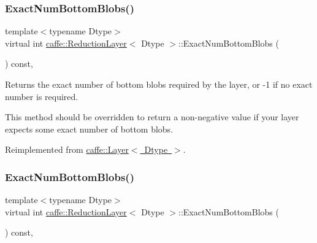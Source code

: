 \subsubsection{\texorpdfstring{Exact\+Num\+Bottom\+Blobs()}{ExactNumBottomBlobs()}\hspace{0.1cm}{\footnotesize\ttfamily [1/2]}}
{\footnotesize\ttfamily template$<$typename Dtype$>$ \\
virtual int \mbox{\hyperlink{classcaffe_1_1_reduction_layer}{caffe\+::\+Reduction\+Layer}}$<$ Dtype $>$\+::Exact\+Num\+Bottom\+Blobs (\begin{DoxyParamCaption}{ }\end{DoxyParamCaption}) const\hspace{0.3cm}{\ttfamily [inline]}, {\ttfamily [virtual]}}



Returns the exact number of bottom blobs required by the layer, or -\/1 if no exact number is required. 

This method should be overridden to return a non-\/negative value if your layer expects some exact number of bottom blobs. 

Reimplemented from \mbox{\hyperlink{classcaffe_1_1_layer_a8e5ee0494d85f5f55fc4396537cbc60f}{caffe\+::\+Layer$<$ Dtype $>$}}.

\mbox{\label{classcaffe_1_1_reduction_layer_a64694af2e56723590072cac88bf825c7}} 
\subsubsection{\texorpdfstring{Exact\+Num\+Bottom\+Blobs()}{ExactNumBottomBlobs()}\hspace{0.1cm}{\footnotesize\ttfamily [2/2]}}
{\footnotesize\ttfamily template$<$typename Dtype$>$ \\
virtual int \mbox{\hyperlink{classcaffe_1_1_reduction_layer}{caffe\+::\+Reduction\+Layer}}$<$ Dtype $>$\+::Exact\+Num\+Bottom\+Blobs (\begin{DoxyParamCaption}{ }\end{DoxyParamCaption}) const\hspace{0.3cm}{\ttfamily [inline]}, {\ttfamily [virtual]}}



